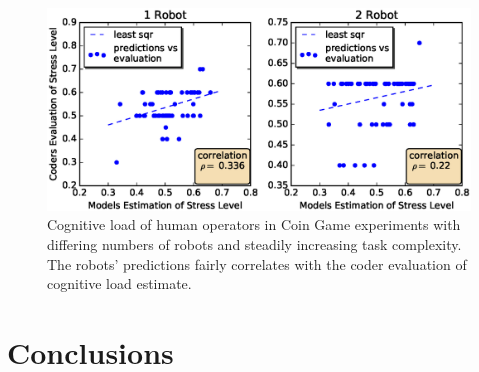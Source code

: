 \documentclass{sig-alternate}
\begin{document}

\begin{figure}  
\centering
\includegraphics[width=.5\textwidth]{coder_eval_1_2.eps}
\caption{Cognitive load of human operators in Coin Game experiments with differing numbers of robots and steadily increasing task complexity. The robots' predictions fairly correlates with the coder evaluation of cognitive load estimate.}
\label{fig:coder_eval_1_2}
\end{figure}


\section{Conclusions}
\end{document}
